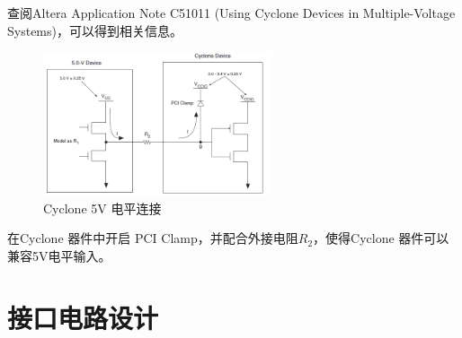 \documentclass[16pt,a4paper]{article}
\begin{document}
查阅Altera Application Note C51011 (Using Cyclone Devices in Multiple-Voltage Systems)，可以得到相关信息。
\begin{figure}[H]
\centering
\includegraphics[width=0.6\textwidth]{5V.png}
\caption{Cyclone 5V 电平连接}
\end{figure}
在Cyclone 器件中开启 PCI Clamp，并配合外接电阻$R_2$，使得Cyclone 器件可以兼容5V电平输入。

\section{接口电路设计}

\end{document}
